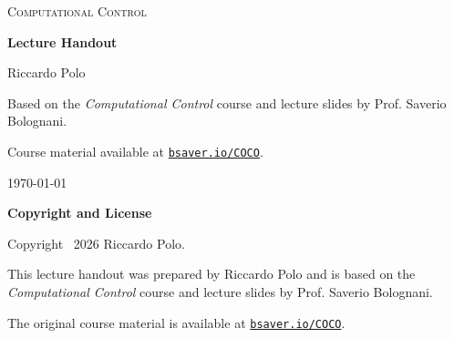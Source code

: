 \documentclass[11pt,a4paper]{article}
\begin{document}
\begin{titlepage}
    \centering

    {\scshape\LARGE Computational Control\par}

    \vspace{0.6cm}

    {\huge\bfseries Lecture Handout\par}

    \vfill

    {\large Riccardo Polo\par}

    \vspace{0.5cm}

    {\small
    Based on the \emph{Computational Control} course and lecture slides
    by Prof. Saverio Bolognani.\par}

    \vspace{0.2cm}

    {\small
    Course material available at
    \href{https://bsaver.io/COCO}{\texttt{bsaver.io/COCO}}.\par}

    \vspace{0.8cm}

    {\large \today\par}
\end{titlepage}

\clearpage
\thispagestyle{empty}

\vspace*{\fill}

\begin{center}
    {\large\bfseries Copyright and License\par}

    \vspace{1cm}

    Copyright \textcopyright\ 2026 Riccardo Polo.

    \vspace{0.8cm}

    This lecture handout was prepared by Riccardo Polo and is based on
    the \emph{Computational Control} course and lecture slides by
    Prof. Saverio Bolognani.

    \medskip

    The original course material is available at
    \href{https://bsaver.io/COCO}{\texttt{bsaver.io/COCO}}.

    \vspace{1cm}

    \doclicenseThis
\end{center}
\end{document}
